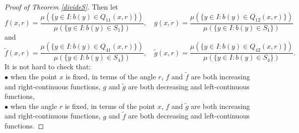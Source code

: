 \documentclass[oneside,english,a4wide]{amsart}
\numberwithin{equation}{section}
\numberwithin{figure}{section}
\theoremstyle{plain}
\theoremstyle{plain}
\theoremstyle{definition}
\theoremstyle{plain}
\theoremstyle{remark}
\theoremstyle{definition}
\theoremstyle{remark}
\theoremstyle{definition}
\newcommand{\8}{\infty}
\begin{document}
\begin{proof}[Proof of Theorem \ref{divideS}]
	
	
	
	
	
	
	
	
	
	
	
	
	
	
	
	
	Then let
	\begin{equation*}
		f(x,r)=\frac{\mu(\{y\in I:b(y)\in Q_{11}(x,r)\})}{\mu(\{y\in I:b(y)\in S_1\})},\quad g(x,r)=\frac{\mu(\{y\in I:b(y)\in Q_{12}(x,r)\})}{\mu(\{y\in I:b(y)\in S_1\})}
	\end{equation*}
	and
	\begin{equation*}
		\tilde{f}(x,r)=\frac{\mu(\{y\in I:b(y)\in Q_{41}(x,r)\})}{\mu(\{y\in I:b(y)\in S_4\})},\quad \tilde{g}(x,r)=\frac{\mu(\{y\in I:b(y)\in Q_{42}(x,r)\})}{\mu(\{y\in I:b(y)\in S_4\})}.
	\end{equation*}
	It is not hard to check that:\\
	$\bullet$ when the point $x$ is fixed, in terms of the angle $r$, $f$ and $\tilde{f}$ are both increasing and right-continuous functions, $g$ and $\tilde{g}$ are both decreasing and left-continuous functions,\\
	$\bullet$ when the angle $r$ is fixed, in terms of the point $x$, $f$ and $\tilde{g}$ are both increasing and right-continuous functions, $g$ and $\tilde{f}$ are both decreasing and left-continuous functions.
	

\end{proof}
\end{document}
